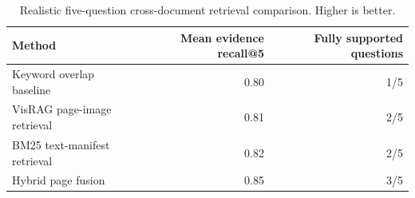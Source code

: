 \begin{table}[t]
  \caption{Realistic five-question cross-document retrieval comparison. Higher is better.}
  \label{tab:retrieval-summary}
  \centering
  \small
  \setlength{\tabcolsep}{4pt}
  \begin{tabularx}{\linewidth}{Yrr}
    \toprule
    Method & Mean evidence recall@5 & Fully supported questions \\
    \midrule
    Keyword overlap baseline & 0.80 & 1/5 \\
    VisRAG page-image retrieval & 0.81 & 2/5 \\
    BM25 text-manifest retrieval & 0.82 & 2/5 \\
    Hybrid page fusion & 0.85 & 3/5 \\
    \bottomrule
  \end{tabularx}
\end{table}
